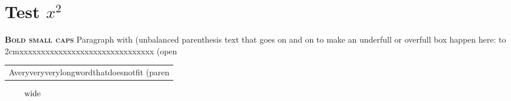 \documentclass[a4paper,nonexistentoption]{article}
\begin{document}
\section{Test $x^2$}




\label{dup}\label{dup}
{\bfseries\scshape Bold small caps}
Paragraph with (unbalanced parenthesis text that goes on and on to make an underfull or overfull box happen here: \hbox to 2cm{xxxxxxxxxxxxxxxxxxxxxxxxxxxxxxx (open}

\begin{tabular}{p{1cm}}
Averyveryverylongwordthatdoesnotfit (paren \\
\end{tabular}

\[ \hbox to 20cm{wide} \]
\missingfilemacro
\end{document}
